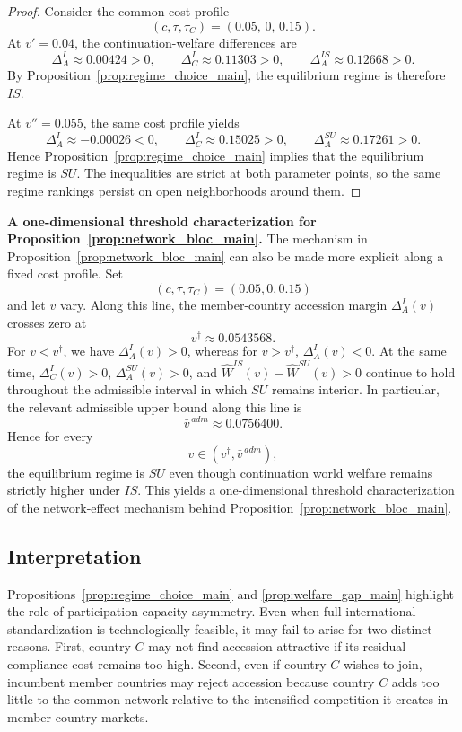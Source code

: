\begin{proof}
Consider the common cost profile
\[
(c,\tau,\tau_C)=(0.05,\,0,\,0.15).
\]
At $v'=0.04$, the continuation-welfare differences are
\[
\Delta_A^I\approx 0.00424>0,\qquad
\Delta_C^I\approx 0.11303>0,\qquad
\Delta_A^{IS}\approx 0.12668>0.
\]
By Proposition~\ref{prop:regime_choice_main}, the equilibrium regime is
therefore $IS$.

At $v''=0.055$, the same cost profile yields
\[
\Delta_A^I\approx -0.00026<0,\qquad
\Delta_C^I\approx 0.15025>0,\qquad
\Delta_A^{SU}\approx 0.17261>0.
\]
Hence Proposition~\ref{prop:regime_choice_main} implies that the equilibrium
regime is $SU$. The inequalities are strict at both parameter points, so the
same regime rankings persist on open neighborhoods around them.
\end{proof}

\noindent\textbf{A one-dimensional threshold characterization for Proposition~\ref{prop:network_bloc_main}.}
The mechanism in Proposition~\ref{prop:network_bloc_main} can also be made
more explicit along a fixed cost profile. Set
\[
(c,\tau,\tau_C)=(0.05,0,0.15)
\]
and let $v$ vary. Along this line, the member-country accession margin
$\Delta_A^I(v)$ crosses zero at
\[
v^\dagger \approx 0.0543568.
\]
For $v<v^\dagger$, we have $\Delta_A^I(v)>0$, whereas for $v>v^\dagger$,
$\Delta_A^I(v)<0$. At the same time, $\Delta_C^I(v)>0$,
$\Delta_A^{SU}(v)>0$, and $\widehat W^{IS}(v)-\widehat W^{SU}(v)>0$ continue
to hold throughout the admissible interval in which $SU$ remains interior. In
particular, the relevant admissible upper bound along this line is
\[
\bar v^{\,adm}\approx 0.0756400.
\]
Hence for every
\[
v\in(v^\dagger,\bar v^{\,adm}),
\]
the equilibrium regime is $SU$ even though continuation world welfare remains
strictly higher under $IS$. This yields a one-dimensional threshold
characterization of the network-effect mechanism behind
Proposition~\ref{prop:network_bloc_main}.

\subsection{Interpretation}

Propositions~\ref{prop:regime_choice_main} and \ref{prop:welfare_gap_main}
highlight the role of participation-capacity asymmetry. Even when full
international standardization is technologically feasible, it may fail to arise
for two distinct reasons. First, country $C$ may not find accession attractive
if its residual compliance cost remains too high. Second, even if country $C$
wishes to join, incumbent member countries may reject accession because country
$C$ adds too little to the common network relative to the intensified
competition it creates in member-country markets.

